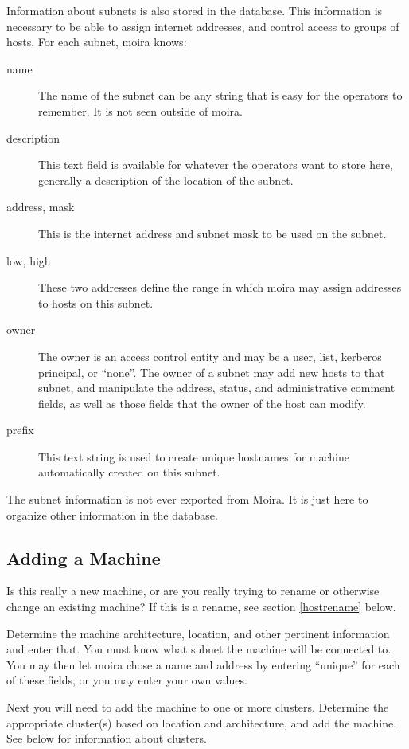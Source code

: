\documentclass{book}
\begin{document}
Information about subnets is also stored in the database.  This
information is necessary to be able to assign internet addresses, and
control access to groups of hosts.  For each subnet, moira knows:
\begin{description}
\item[name] The name of the subnet can be any string that is easy for
the operators to remember.  It is not seen outside of moira.
\item[description] This text field is available for whatever the
operators want to store here, generally a description of the location
of the subnet.
\item[address, mask] This is the internet address and subnet mask to
be used on the subnet.
\item[low, high] These two addresses define the range in which moira
may assign addresses to hosts on this subnet.
\item[owner] The owner is an access control entity and may be a user,
list, kerberos principal, or ``none''.  The owner of a subnet may add
new hosts to that subnet, and manipulate the address, status,
and administrative comment fields, as well as those fields that the
owner of the host can modify.
\item[prefix] This text string is used to create unique hostnames for
machine automatically created on this subnet.
\end{description}
The subnet information is not ever exported from Moira.  It is just
here to organize other information in the database.

\subsection{Adding a Machine}

Is this really a new machine, or are you really trying to rename or
otherwise change an existing machine?  If this is a rename, see
section \ref{hostrename} below.

Determine the machine architecture, location, and other pertinent
information and enter that.  You must know what subnet the machine
will be connected to.  You may then let moira chose a name and address
by entering ``unique'' for each of these fields, or you may enter your
own values.

Next you will need to add the machine to one or more clusters.
Determine the appropriate cluster(s) based on location and
architecture, and add the machine.  See below for information about
clusters.
\end{document}
